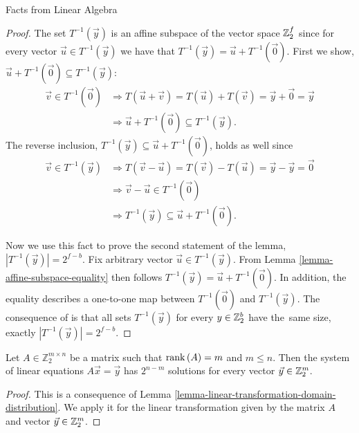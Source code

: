 \begin{chapter}{Facts from Linear Algebra}
\begin{proof}
The set $T^{-1}(\vec{y})$ is an affine subspace of the vector space $\mathbb{Z}_{2}^{f}$ since for every vector $\vec{u} \in T^{-1}(\vec{y})$ we have that $T^{-1}(\vec{y}) = \vec{u} + T^{-1}(\vec{0})$. First we show, $\vec{u} + T^{-1}(\vec{0}) \subseteq T^{-1}(\vec{y})$:
\[
\begin{split}
\vec{v} \in T^{-1}(\vec{0}) 
	& \Rightarrow T(\vec{u} + \vec{v}) = T(\vec{u}) + T(\vec{v}) = \vec{y} + \vec{0} = \vec{y}  \\
	& \Rightarrow \vec{u} + T^{-1}(\vec{0}) \subseteq T^{-1}(\vec{y}) \text{.}
\end{split}
\]
The reverse inclusion, $T^{-1}(\vec{y}) \subseteq \vec{u} + T^{-1}(\vec{0})$, holds as well since
\[
\begin{split}
\vec{v} \in T^{-1}(\vec{y}) 
	& \Rightarrow T(\vec{v} - \vec{u}) = T(\vec{v}) - T(\vec{u}) = \vec{y} - \vec{y} = \vec{0} \\
	& \Rightarrow \vec{v} - \vec{u} \in T^{-1}(\vec{0}) \\
	& \Rightarrow T^{-1}(\vec{y}) \subseteq \vec{u} + T^{-1}(\vec{0}) \text{.}
\end{split}
\]

Now we use this fact to prove the second statement of the lemma, $|T^{-1}(\vec{y})| = 2 ^ {f - b}$. Fix arbitrary vector $\vec{u} \in T^{-1}(\vec{y})$. From Lemma \ref{lemma-affine-subspace-equality} then follows $T^{-1}(\vec{y}) = \vec{u} + T^{-1}(\vec{0})$. In addition, the equality describes a one-to-one map between $T^{-1}(\vec{0})$ and $T^{-1}(\vec{y})$. The consequence of is that all sets $T^{-1}(\vec{y})$ for every $y \in \mathbb{Z}_{2}^{b}$ have the~same size, exactly $|T^{-1}(\vec{y})| = 2^{f - b}$.
\end{proof}

\begin{lemma}
\label{lemma-system-of-linear-equations-solution-count}
Let $A \in \mathbb{Z}_2^{m \times n}$ be a matrix such that $\mathrm{rank}\left({A}\right) = m$ and $m \leq n$. Then the system of linear equations $A\vec{x} = \vec{y}$ has $2 ^ {n - m}$ solutions for every vector $\vec{y} \in \mathbb{Z}_{2}^{m}$.
\end{lemma}
\begin{proof}
This is a consequence of Lemma \ref{lemma-linear-transformation-domain-distribution}. We apply it for the linear transformation given by the matrix $A$ and vector $\vec{y} \in \mathbb{Z}_{2}^{m}$.



\end{proof}
\end{chapter}
